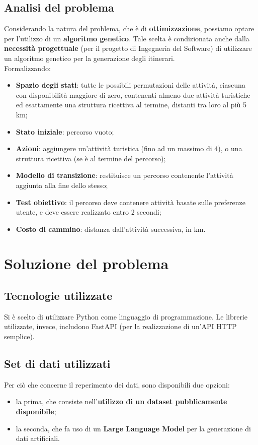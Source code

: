\documentclass{CSUniSchoolLabReport}
\begin{document}
\pagebreak

\subsection{Analisi del problema}

Considerando la natura del problema, che è di \textbf{ottimizzazione}, possiamo optare per l'utilizzo di un \textbf{algoritmo genetico}. Tale scelta è condizionata anche dalla \textbf{necessità progettuale} (per il progetto di Ingegneria del Software) di utilizzare un algoritmo genetico per la generazione degli itinerari. \\
Formalizzando:
\begin{itemize}
    \item \textbf{Spazio degli stati}: tutte le possibili permutazioni delle attività, ciascuna con disponibilità maggiore di zero, contenenti almeno due attività turistiche ed esattamente una struttura ricettiva al termine, distanti tra loro al più 5 km; 
    \item \textbf{Stato iniziale}: percorso vuoto;
    \item \textbf{Azioni}: aggiungere un'attività turistica (fino ad un massimo di 4), o una struttura ricettiva (se è al termine del percorso);
    \item \textbf{Modello di transizione}: restituisce un percorso contenente l'attività aggiunta alla fine dello stesso;
    \item \textbf{Test obiettivo}: il percorso deve contenere attività basate sulle preferenze utente, e deve essere realizzato entro 2 secondi;
    \item \textbf{Costo di cammino}: distanza dall'attività successiva, in km.
\end{itemize}

\section{Soluzione del problema}
\subsection{Tecnologie utilizzate}

Si è scelto di utilizzare Python come linguaggio di programmazione. Le librerie utilizzate, invece, includono FastAPI (per la realizzazione di un'API HTTP semplice).

\subsection{Set di dati utilizzati}

Per ciò che concerne il reperimento dei dati, sono disponibili due opzioni:

\begin{itemize}
    \item la prima, che consiste nell'\textbf{utilizzo di un dataset pubblicamente disponibile};
    \item la seconda, che fa uso di un \textbf{Large Language Model} per la generazione di dati artificiali.
\end{itemize}
\end{document}
